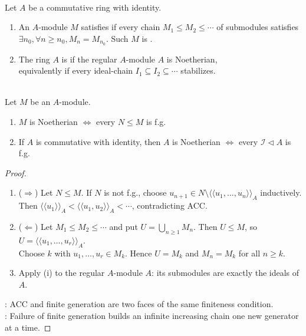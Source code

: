 \begin{definition} \label{def:noetherian-module-ring-acc} \\
Let $A$ be a commutative ring with identity.
\begin{enumerate}[label=(\roman*)]
\setlength{\itemsep}{0pt}
\item An $A$-module $M$ satisfies  if every chain $M_1\leq M_2\leq\cdots$ of submodules satisfies\\
$\exists n_0, \forall n\geq n_0, M_n=M_{n_0}$. Such $M$ is .
\item The ring $A$ is  if the regular $A$-module $A$ is Noetherian,\\ equivalently if every ideal-chain $I_1\subseteq I_2\subseteq\cdots$ stabilizes.
\end{enumerate}
\end{definition}

\begin{theorem} \label{thm:noetherian-iff-submodules-finitely-generated} \\
Let $M$ be an $A$-module.
\begin{enumerate}[label=(\roman*)]
\setlength{\itemsep}{0pt}
\item $M$ is Noetherian $\Longleftrightarrow$ every $N\leq M$ is f.g.
\item If $A$ is commutative with identity, then $A$ is Noetherian
$\Longleftrightarrow$ every $\mathcal{I}\lhd A$ is f.g.
\end{enumerate}
\begin{proof}
\begin{enumerate}[label=(\roman*).]
\setlength{\itemsep}{0pt}
\item[$(i)$]($\Rightarrow$) Let $N\leq M$. If $N$ is not f.g., choose $u_{n+1}\in N\setminus\langle\!\langle u_1,\ldots,u_n\rangle\!\rangle_A$ inductively.\\
Then $\langle\!\langle u_1\rangle\!\rangle_A< \langle\!\langle u_1,u_2\rangle\!\rangle_A<\cdots$, contradicting ACC.
\item[$(i)$]($\Leftarrow$) Let $M_1\leq M_2\leq\cdots$ and put $U=\bigcup_{n\geq1}M_n$. Then $U\leq M$, so $U=\langle\!\langle u_1,\ldots,u_r\rangle\!\rangle_A$.\\
Choose $k$ with $u_1,\ldots,u_r\in M_k$. Hence $U=M_k$ and $M_n=M_k$ for all $n\geq k$.
\item[$(ii)$] Apply (i) to the regular $A$-module $A$: its submodules are exactly the ideals of $A$.
\end{enumerate}
\noindent
{}: ACC and finite generation are two faces of the same finiteness condition.\\
: Failure of finite generation builds an infinite increasing chain one new generator at a time.
\end{proof}
\end{theorem}

